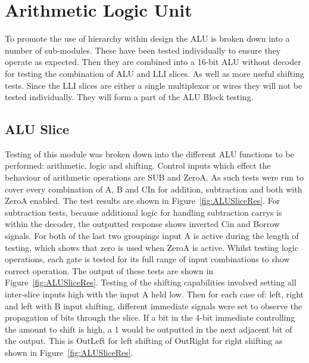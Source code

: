 
\section{Arithmetic Logic Unit}

To promote the use of hierarchy within design the ALU is broken down into a number of sub-modules. These have been tested individually to ensure they operate as expected. Then they are combined into a 16-bit ALU without decoder for testing the combination of ALU and LLI slices. As well as more useful shifting tests. Since the LLI slices are either a single multiplexor or wires they will not be tested individually. They will form a part of the ALU Block testing. 

\subsection{ALU Slice}
Testing of this module was broken down into the different ALU functions to be performed: arithmetic, logic and shifting. Control inputs which effect the behaviour of arithmetic operations are SUB and ZeroA. As such tests were run to cover every combination of A, B and CIn for addition, subtraction and both with ZeroA enabled. The test results are shown in Figure~\ref{fig:ALUSliceRes}. For subtraction tests, because additional logic for handling subtraction carrys is within the decoder, the outputted response shows inverted Cin and Borrow signals. For both of the last two groupings input A is active during the length of testing, which shows that zero is used when ZeroA is active. Whilst testing logic operations, each gate is tested for its full range of input combinations to show correct operation. The output of these tests are shown in Figure~\ref{fig:ALUSliceRes}. Testing of the shifting capabilities involved setting all inter-slice inputs high with the input A held low. Then for each case of: left, right and left with B input shifting, different immediate signals were set to observe the propagation of bits through the slice. If a bit in the 4-bit immediate controlling the amount to shift is high, a 1 would be outputted in the next adjacent bit of the output. This is OutLeft for left shifting of OutRight for right shifting as shown in Figure~\ref{fig:ALUSliceRes}. 

